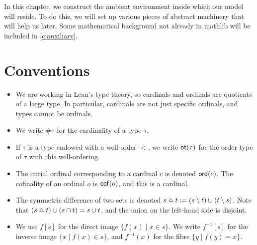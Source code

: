 In this chapter, we construct the ambient environment inside which our model will reside.
To do this, we will set up various pieces of abstract machinery that will help us later.
Some mathematical background not already in mathlib will be included in \cref{c:auxiliary}.

\section{Conventions}
\begin{itemize}
  \item We are working in Lean's type theory, so cardinals and ordinals are quotients of a large type.
  In particular, cardinals are not just specific ordinals, and types cannot be ordinals.
  \item We write \( \#\tau \) for the cardinality of a type \( \tau \).
  \item If \( \tau \) is a type endowed with a well-order \( < \), we write \( \operatorname{\mathsf{ot}}(\tau) \) for the order type of \( \tau \) with this well-ordering.
  \item The initial ordinal corresponding to a cardinal \( c \) is denoted \( \operatorname{\mathsf{ord}}(c) \).
  The cofinality of an ordinal \( o \) is \( \operatorname{\mathsf{cof}}(o) \), and this is a cardinal.
  \item The symmetric difference of two sets is denoted \( s \symmdiff t \coloneq (s \setminus t) \cup (t \setminus s) \).
  Note that \( (s \symmdiff t) \cup (s \cap t) = s \cup t \), and the union on the left-hand side is disjoint.
  \item We use \( f[s] \) for the direct image \( \{ f(x) \mid x \in s \} \). We write \( f^{-1}[s] \) for the inverse image \( \{ x \mid f(x) \in s \} \), and \( f^{-1}(x) \) for the fibre \( \{ y \mid f(y) = x \} \).
\end{itemize}

